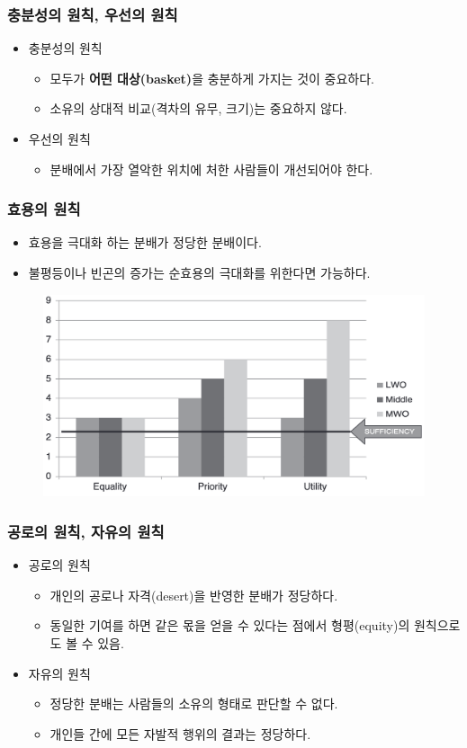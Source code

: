 \documentclass[aspectratio=169,xcolor=dvipsnames,handout]{beamer}
\begin{document}
\begin{frame}[<+->]
\frametitle{충분성의 원칙, 우선의 원칙}
    \begin{itemize}
        \item 충분성의 원칙
        \begin{itemize}
            \item 모두가 \textbf{어떤 대상(basket)}을 충분하게 가지는 것이 중요하다.
            \item 소유의 상대적 비교(격차의 유무, 크기)는 중요하지 않다.
        \end{itemize}
        \item 우선의 원칙
        \begin{itemize}
            \item 분배에서 가장 열악한 위치에 처한 사람들이 개선되어야 한다.
        \end{itemize}
    \end{itemize}
\end{frame}

\begin{frame}[<+->]
\frametitle{효용의 원칙}
    \begin{itemize}
        \item 효용을 극대화 하는 분배가 정당한 분배이다.
        \item 불평등이나 빈곤의 증가는 순효용의 극대화를 위한다면 가능하다.
    \end{itemize}
    \begin{figure}
        \centering
        \includegraphics[width=.6\textwidth]{pic/fig1_4.png}
    \end{figure}
\end{frame}

\begin{frame}[<+->]
\frametitle{공로의 원칙, 자유의 원칙}
    \begin{itemize}
        \item 공로의 원칙
        \begin{itemize}
            \item 개인의 공로나 자격(desert)을 반영한 분배가 정당하다.
            \item 동일한 기여를 하면 같은 몫을 얻을 수 있다는 점에서 형평(equity)의 원칙으로도 볼 수 있음.
        \end{itemize}
        \item 자유의 원칙
        \begin{itemize}
            \item 정당한 분배는 사람들의 소유의 형태로 판단할 수 없다.
            \item 개인들 간에 모든 자발적 행위의 결과는 정당하다.
        \end{itemize}
    \end{itemize}
\end{frame}
\end{document}
